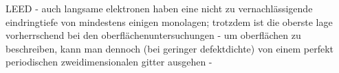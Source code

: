  LEED
 -  auch langsame elektronen haben eine nicht zu vernachlässigende eindringtiefe von mindestens einigen
 monolagen; trotzdem ist die oberste lage vorherrschend bei den oberflächenuntersuchungen
 - um oberflächen zu beschreiben, kann man dennoch (bei geringer defektdichte) von einem perfekt periodischen
 zweidimensionalen gitter ausgehen
 - 
 
 